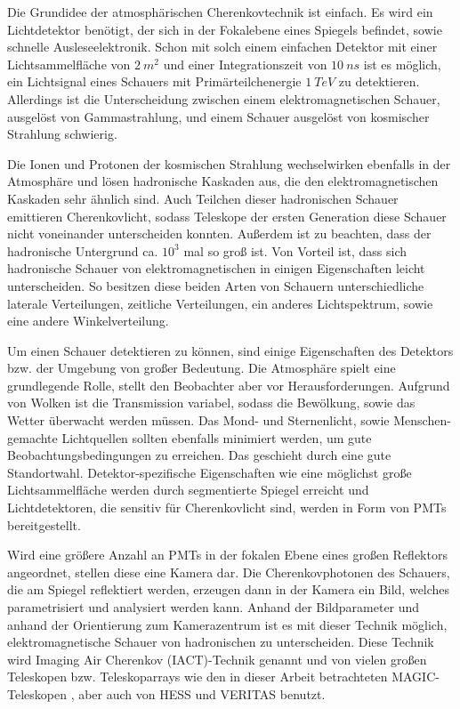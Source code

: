 Die Grundidee der atmosphärischen Cherenkovtechnik ist einfach.
Es wird ein Lichtdetektor benötigt, der sich in der Fokalebene eines Spiegels befindet, sowie schnelle Ausleseelektronik.
Schon mit solch einem einfachen Detektor mit einer Lichtsammelfläche von $\SI{2}{m^2}$ und einer Integrationszeit von $\SI{10}{ns}$ ist es möglich, ein Lichtsignal eines Schauers mit Primärteilchenergie $\SI{1}{TeV}$ zu detektieren.
Allerdings ist die Unterscheidung zwischen einem elektromagnetischen Schauer, ausgelöst von Gammastrahlung, und einem Schauer ausgelöst von kosmischer Strahlung schwierig.\cite{Weekes}

Die Ionen und Protonen der kosmischen Strahlung wechselwirken ebenfalls in der Atmosphäre und lösen hadronische Kaskaden aus, die den elektromagnetischen Kaskaden sehr ähnlich sind.
Auch Teilchen dieser hadronischen Schauer emittieren Cherenkovlicht, sodass Teleskope der ersten Generation diese Schauer nicht voneinander unterscheiden konnten.
Außerdem ist zu beachten, dass der hadronische Untergrund ca. $10^3$ mal so groß ist.
Von Vorteil ist, dass sich hadronische Schauer von elektromagnetischen in einigen Eigenschaften leicht unterscheiden.
So besitzen diese beiden Arten von Schauern unterschiedliche laterale Verteilungen, zeitliche Verteilungen, ein anderes Lichtspektrum, sowie eine andere Winkelverteilung.\cite{Weekes}

Um einen Schauer detektieren zu können, sind einige Eigenschaften des Detektors bzw. der Umgebung von großer Bedeutung.
Die Atmosphäre spielt eine grundlegende Rolle, stellt den Beobachter aber vor Herausforderungen. 
Aufgrund von Wolken ist die Transmission variabel, sodass die Bewölkung, sowie das Wetter überwacht werden müssen.
Das Mond- und Sternenlicht, sowie Menschen-gemachte Lichtquellen sollten ebenfalls minimiert werden, um gute Beobachtungsbedingungen zu erreichen. 
Das geschieht durch eine gute Standortwahl.
Detektor-spezifische Eigenschaften wie eine möglichst große Lichtsammelfläche werden durch segmentierte Spiegel erreicht und Lichtdetektoren, die sensitiv für Cherenkovlicht sind, werden in Form von PMTs bereitgestellt.\cite{Weekes}

Wird eine größere Anzahl an PMTs in der fokalen Ebene eines großen Reflektors angeordnet, stellen diese eine Kamera dar.
Die Cherenkovphotonen des Schauers, die am Spiegel reflektiert werden, erzeugen dann in der Kamera ein Bild, welches parametrisiert und analysiert werden kann.
Anhand der Bildparameter und anhand der Orientierung zum Kamerazentrum ist es mit dieser Technik möglich, elektromagnetische Schauer von hadronischen zu unterscheiden.
Diese Technik wird Imaging Air Cherenkov (IACT)-Technik genannt und von vielen großen Teleskopen bzw. Teleskoparrays wie den in dieser Arbeit betrachteten MAGIC-Teleskopen \cite{MAGIC_Telescopes}, aber auch von HESS \cite{HESS} und VERITAS \cite{VERITAS} benutzt.\cite{Weekes}

